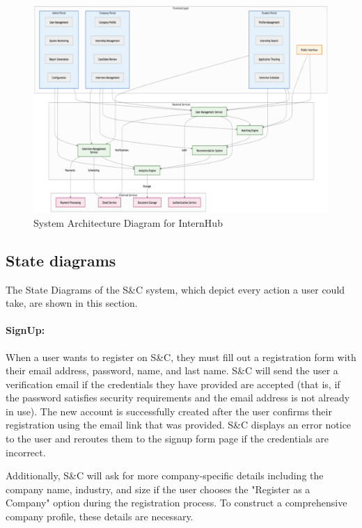 \begin{figure}[H]
    \begin{center}
        \includegraphics[width=0.9\linewidth]{JhaBhatiaSharma/Images/systemArchitecture.png}
        \caption{System Architecture Diagram for InternHub}
        \label{fig:SysArchitecture}%
    \end{center}
\end{figure}

\subsection{State diagrams}
\label{subsec:state_diagrams}%
The State Diagrams of the S\&C system, which depict every action a user could take, are shown in this section.

\paragraph{SignUp:}
When a user wants to register on S\&C, they must fill out a registration form with their email address, password, name, and last name. S\&C will send the user a verification email if the credentials they have provided are accepted (that is, if the password satisfies security requirements and the email address is not already in use). The new account is successfully created after the user confirms their registration using the email link that was provided. S\&C displays an error notice to the user and reroutes them to the signup form page if the credentials are incorrect.

Additionally, S\&C will ask for more company-specific details including the company name, industry, and size if the user chooses the "Register as a Company" option during the registration process. To construct a comprehensive company profile, these details are necessary.


